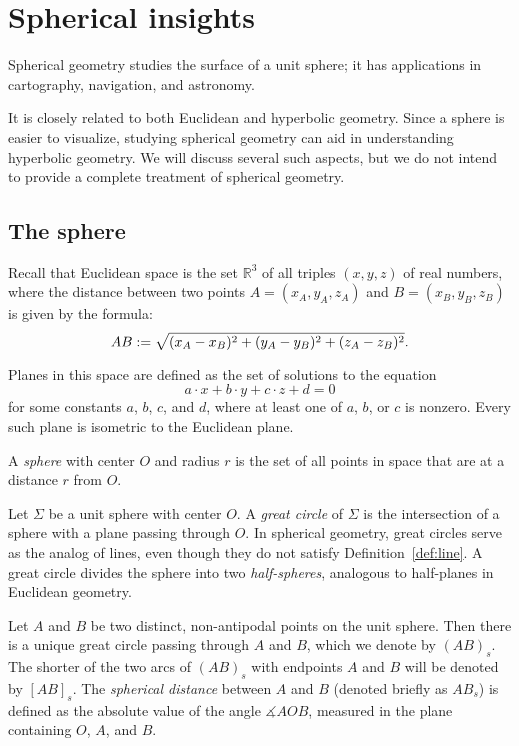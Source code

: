 \chapter{Spherical insights}
\label{chap:sphere}

Spherical geometry studies the surface of a unit sphere; it has applications in cartography, navigation, and astronomy.

It is closely related to both Euclidean and hyperbolic geometry.
Since a sphere is easier to visualize, studying spherical geometry can aid in understanding hyperbolic geometry.
We will discuss several such aspects, but we do not intend to provide a complete treatment of spherical geometry.



\section{The sphere}

Recall that Euclidean space is the set \( \mathbb{R}^3 \) of all triples \( (x,y,z) \) of real numbers,
where the distance between two points
\( A = (x_A, y_A, z_A) \) and \( B = (x_B, y_B, z_B) \)
is given by the formula:
\[
AB := \sqrt{(x_A - x_B)^2 + (y_A - y_B)^2 + (z_A - z_B)^2}.
\]

Planes in this space are defined as the set of solutions to the equation
\[
a \cdot x + b \cdot y + c \cdot z + d = 0
\]
for some constants \( a \), \( b \), \( c \), and \( d \),
where at least one of \( a \), \( b \), or \( c \) is nonzero.
Every such plane is isometric to the Euclidean plane.

A \emph{sphere} with center \( O \) and radius \( r \) is the set of all points in space that are at a distance \( r \) from \( O \).

Let \(\Sigma\) be a unit sphere with center \( O \).
A \emph{great circle} of \(\Sigma\) is the intersection of a sphere with a plane passing through \( O \).
In spherical geometry, great circles serve as the analog of lines, even though they do not satisfy Definition~\ref{def:line}.
A great circle divides the sphere into two \emph{half-spheres}, analogous to half-planes in Euclidean geometry.

Let \( A \) and \( B \) be two distinct, non-antipodal points on the unit sphere.
Then there is a unique great circle passing through \( A \) and \( B \), which we denote by \( (AB)_s \).
The shorter of the two arcs of \( (AB)_s \) with endpoints \( A \) and \( B \) will be denoted by \( [AB]_s \).
The \emph{spherical distance} between \( A \) and \( B \) (denoted briefly as \( AB_s \)) is defined as the absolute value of the angle \( \measuredangle AOB \), measured in the plane containing \( O \), \( A \), and \( B \).

